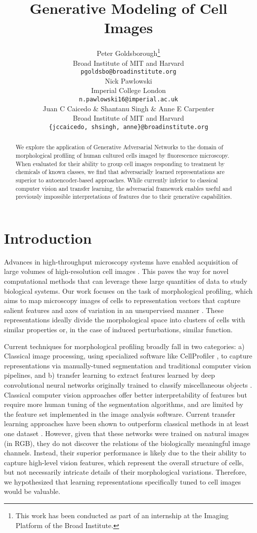 \documentclass{article}
\title{Generative Modeling of Cell Images}
\author{
  Peter Goldsborough\thanks{This work has been conducted as part of an internship at the Imaging Platform of the Broad Institute.}\\
  Broad Institute of MIT and Harvard \\
  \texttt{pgoldsbo@broadinstitute.org} \\
  \And
  Nick Pawlowski \\
  Imperial College London \\
  \texttt{n.pawlowski16@imperial.ac.uk} \\
  \AND
  Juan C Caicedo \& Shantanu Singh \& Anne E Carpenter\\
  Broad Institute of MIT and Harvard \\
  \texttt{\{jccaicedo, shsingh, anne\}@broadinstitute.org} \\
}
\begin{document}
\maketitle

\begin{abstract}
We explore the application of Generative Adversarial Networks to the domain of morphological profiling of human cultured cells imaged by fluorescence microscopy. When evaluated for their ability to group cell images responding to treatment by chemicals of known classes, we find that adversarially learned representations are superior to autoencoder-based approaches. While currently inferior to classical computer vision and transfer learning, the adversarial framework enables useful and previously impossible interpretations of features due to their generative capabilities.
\end{abstract}

\section{Introduction}
Advances in high-throughput microscopy systems have enabled acquisition of large
volumes of high-resolution cell images \cite{Kraus2016}. This paves the way for
novel computational methods that can leverage these large quantities of data to
study biological systems. Our work focuses on the task of morphological
profiling, which aims to map microscopy images of cells to representation
vectors that capture salient features and axes of variation in an unsupervised
manner \cite{caicedo_profiling}. These representations ideally divide the
morphological space into clusters of cells with similar properties or, in the
case of induced perturbations, similar function.

Current techniques for morphological profiling broadly fall in two categories:
a) Classical image processing, using specialized software like CellProfiler
\cite{Carpenter2006}, to capture representations via manually-tuned segmentation
and traditional computer vision pipelines, and b) transfer learning to extract
features learned by deep convolutional neural networks originally trained to
classify miscellaneous objects \cite{pawlowski2016automating,
ando2017improving}. Classical computer vision approaches offer better
interpretability of features but require more human tuning of the segmentation
algorithms, and are limited by the feature set implemented in the image analysis
software. Current transfer learning approaches have been shown to outperform
classical methods in at least one dataset \cite{ando2017improving}. However,
given that these networks were trained on natural images (in RGB), they do not
discover the relations of the biologically meaningful image channels. Instead,
their superior performance is likely due to the their ability to capture
high-level vision features, which represent the overall structure of cells, but
not necessarily intricate details of their morphological variations. Therefore,
we hypothesized that learning representations specifically tuned to cell images
would be valuable.
\end{document}
